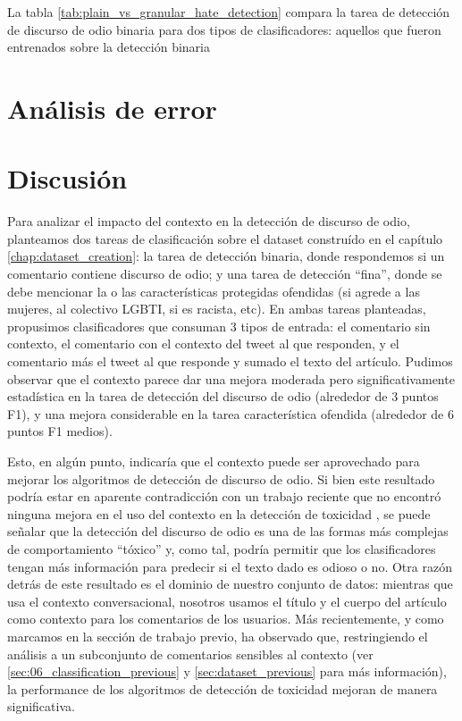 La tabla \ref{tab:plain_vs_granular_hate_detection} compara la tarea de detección de discurso de odio binaria para dos tipos de clasificadores: aquellos que fueron entrenados sobre la detección binaria




\section{Análisis de error}





\section{Discusión}

Para analizar el impacto del contexto en la detección de discurso de odio, planteamos dos tareas de clasificación sobre el dataset construído en el capítulo \ref{chap:dataset_creation}: la tarea de detección binaria, donde respondemos si un comentario contiene discurso de odio; y una tarea de detección ``fina'', donde se debe mencionar la o las características protegidas ofendidas (si agrede a las mujeres, al colectivo LGBTI, si es racista, etc). En ambas tareas planteadas, propusimos clasificadores que consuman 3 tipos de entrada: el comentario sin contexto, el comentario con el contexto del tweet al que responden, y el comentario más el tweet al que responde y sumado el texto del artículo. Pudimos observar que el contexto parece dar una mejora moderada pero significativamente estadística en la tarea de detección del discurso de odio (alrededor de 3 puntos F1), y una mejora considerable en la tarea característica ofendida (alrededor de 6 puntos F1 medios).

Esto, en algún punto, indicaría que el contexto puede ser aprovechado para mejorar los algoritmos de detección de discurso de odio. Si bien este resultado podría estar en aparente contradicción con un trabajo reciente que no encontró ninguna mejora en el uso del contexto en la detección de toxicidad \cite{pavlopoulos2020toxicity}, se puede señalar que la detección del discurso de odio es una de las formas más complejas de comportamiento ``tóxico'' y, como tal, podría permitir que los clasificadores tengan más información para predecir si el texto dado es odioso o no. Otra razón detrás de este resultado es el dominio de nuestro conjunto de datos: mientras que \citet{pavlopoulos2020toxicity} usa el contexto conversacional, nosotros usamos el título y el cuerpo del artículo como contexto para los comentarios de los usuarios. Más recientemente, y como marcamos en la sección de trabajo previo, \citet{xenos-2021-context} ha observado que, restringiendo el análisis a un subconjunto de comentarios sensibles al contexto (ver \ref{sec:06_classification_previous} y \ref{sec:dataset_previous} para más información), la performance de los algoritmos de detección de toxicidad mejoran de manera significativa.

